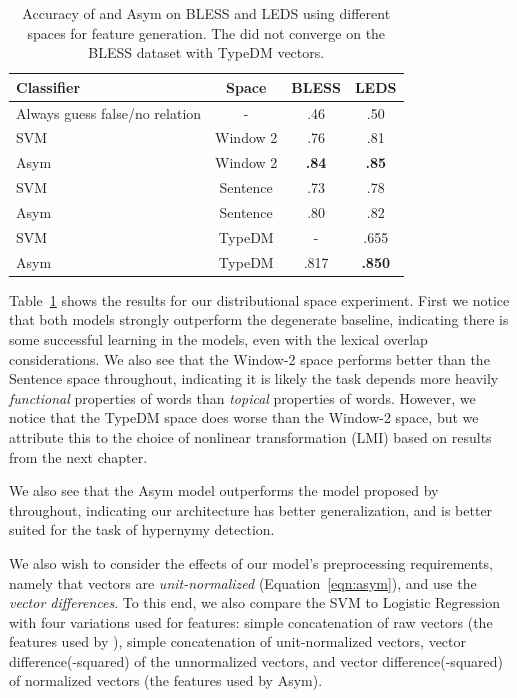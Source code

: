\begin{table}
  \centering
  \begin{tabular}{|lc|cc|}
    \hline
    {\bf Classifier}                      &{\bf Space}& {\bf BLESS}  & {\bf LEDS} \\
    \hline
    \hline
    Always guess false/no relation        &   -       &      .46     &      .50   \\
    \hline
    SVM \cite{baroni:2012:eacl}           & Window 2  &      .76     &      .81   \\
    Asym \cite{roller:2014:coling}        & Window 2  & {\bf .84    }& {\bf .85}  \\
    \hline
    SVM                                   & Sentence  &      .73     &      .78   \\
    Asym                                  & Sentence  &      .80     &      .82   \\
    \hline
    SVM                                   & TypeDM    &        -     &      .655  \\
    Asym                                  & TypeDM    &      .817    & {\bf .850} \\
    \hline
  \end{tabular}
  \caption{Accuracy of  and Asym on BLESS and LEDS
    using different spaces for feature generation. The
     did not converge on the BLESS dataset with
    TypeDM vectors.}
  \label{tab:asymspaces}
\end{table}

Table~\ref{tab:asymspaces} shows the results for our distributional space
experiment.  First we notice that both models strongly outperform the
degenerate baseline, indicating there is some successful learning in the
models, even with the lexical overlap considerations. We also see that the
Window-2 space performs better than the Sentence space throughout,
indicating it is likely the task depends more heavily {\em functional}
properties of words than {\em topical} properties of words. However, we notice
that the TypeDM space does worse than the Window-2 space, but we attribute this
to the choice of nonlinear transformation (LMI) based on results from the next
chapter.

We also see that the Asym model outperforms the model proposed by
 throughout, indicating our
architecture has better generalization, and is better suited for the task
of hypernymy detection.

We also wish to consider the effects of our model's preprocessing requirements,
namely that vectors are {\em unit-normalized} (Equation~\ref{eqn:asym}), and
use the {\em vector differences}. To this end, we also compare the SVM to
Logistic Regression with four variations used for features: simple
concatenation of raw vectors (the features used by ),
simple concatenation of unit-normalized vectors, vector difference(-squared) of
the unnormalized vectors, and vector difference(-squared) of normalized vectors
(the features used by Asym).

